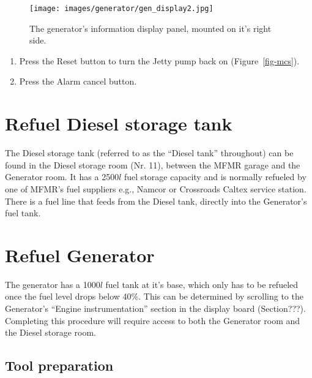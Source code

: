\documentclass[
  letterpaper,
  DIV=11,
  numbers=noendperiod]{scrreprt}
\providecommand{\tightlist}{%
  \setlength{\itemsep}{0pt}\setlength{\parskip}{0pt}}\usepackage{longtable,booktabs,array}
\begin{document}
\begin{figure}[H]

{\centering \texttt{[image: images/generator/gen\_display2.jpg]}

}

\caption{\label{fig-gen-display}The generator's information display
panel, mounted on it's right side.}

\end{figure}

\begin{enumerate}
\def\labelenumi{\arabic{enumi}.}
\setcounter{enumi}{13}
\tightlist
\item
  Press the Reset button to turn the Jetty pump back on
  (Figure~\ref{fig-mcs}).
\item
  Press the Alarm cancel button.
\end{enumerate}

\hypertarget{refuel-diesel-storage-tank}{%
\section{Refuel Diesel storage tank}\label{refuel-diesel-storage-tank}}

The Diesel storage tank (referred to as the ``Diesel tank'' throughout)
can be found in the Diesel storage room (Nr. 11), between the MFMR
garage and the Generator room. It has a 2500\(l\) fuel storage capacity
and is normally refueled by one of MFMR's fuel suppliers e.g., Namcor or
Crossroads Caltex service station. There is a fuel line that feeds from
the Diesel tank, directly into the Generator's fuel tank.

\hypertarget{refuel-generator}{%
\section{Refuel Generator}\label{refuel-generator}}

The generator has a 1000\(l\) fuel tank at it's base, which only has to
be refueled once the fuel level drops below 40\%. This can be determined
by scrolling to the Generator's ``Engine instrumentation'' section in
the display board (Section???). Completing this procedure will require
access to both the Generator room and the Diesel storage room.

\hypertarget{sec-gen-fuel-tool}{%
\subsection{Tool preparation}\label{sec-gen-fuel-tool}}
\end{document}

